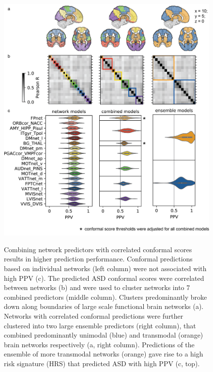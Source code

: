 \documentclass[9pt,lineno]{elife}
\begin{document}
\begin{figure}
\includegraphics[width=\linewidth]{fig1_network}
    \caption{Combining network predictors with correlated conformal scores results in higher prediction performance. Conformal predictions based on individual networks (left column) were not associated with high PPV (c). The predicted ASD conformal scores were correlated between networks (b) and were used to cluster networks into 7 combined predictors (middle column). Clusters predominantly broke down along boundaries of large scale functional brain networks (a). Networks with correlated conformal predictions were further clustered into two large ensemble predictors (right column), that combined predominantly unimodal (blue) and transmodal (orange) brain networks respectively (a, right column). Predictions of the ensemble of more transmodal networks (orange) gave rise to a high risk signature (HRS) that predicted ASD with high PPV (c, top).}
\label{fig:1_network}
\label{figdata:first}
\label{figdata:second}
\label{figdata:third}
\label{figdata:fourth}
\end{figure}
\end{document}
